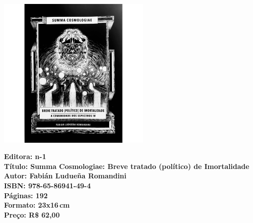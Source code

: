 \pagebreak

\begin{center}
\hspace*{.5cm}\includegraphics[width=74mm]{./CAPAS/tratado.jpg}
\end{center}

\hspace*{-7cm}\hrulefill\hspace*{-7cm}

\medskip

\noindent{}
\vfill

\hspace*{-.4cm}\begin{minipage}[c]{1\linewidth}
\small\textbf{
\hspace*{-.1cm}Editora: n-1\\
Título: Summa Cosmologiae: Breve tratado (político) de Imortalidade\\
Autor: Fabián Ludueña Romandini\\
ISBN: 978-65-86941-49-4\\
Páginas: 192\\
Formato: 23x16\,cm\\
Preço: R\$ 62,00\\
}
\end{minipage}

\pagebreak

\vspace*{1.5cm}


\bigskip

\hfill{}

\bigskip
\bigskip
\bigskip

